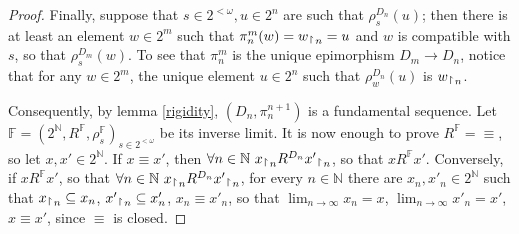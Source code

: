 \documentclass[12pt,twoside,a4paper]{amsart}
\theoremstyle{plain}
\theoremstyle{definition}
\begin{document}
\begin{proof}
Finally, suppose that $s\in 2^{<\omega },u\in 2^n$ are such that $\rho_s^{D_n}(u)$; then there is at least an element $w\in 2^m$ such that $\pi_n^m(w)=w {\, _{{\begin{tikzpicture}[{}]\draw (0,-0.5pt) -- (0,5pt);\draw (0,5pt) -- (1.5pt,3.5pt);\end{tikzpicture}}\, n}}=u$ and $w$ is compatible with $s$, so that $\rho_s^{D_m}(w)$.
To see that $\pi_n^m$ is the unique epimorphism $D_m\to D_n$, notice that for any $w\in 2^m$, the unique element $u\in 2^n$ such that $\rho_w^{D_n}(u)$ is $w {\, _{{\begin{tikzpicture}[{}]\draw (0,-0.5pt) -- (0,5pt);\draw (0,5pt) -- (1.5pt,3.5pt);\end{tikzpicture}}\, n}}$.

Consequently, by lemma \ref{rigidity}, $(D_n,\pi_n^{n+1})$ is a fundamental sequence.
Let $ \mathbb F =( {2^{\mathbb N}} ,R^{ \mathbb F },\rho_s^{ \mathbb F })_{s\in 2^{<\omega }}$ be its inverse limit.
It is now enough to prove $R^{ \mathbb F }= {\equiv } $, so let $x,x'\in {2^{\mathbb N}} $.
If $x\equiv x'$, then $\forall  n\in {\mathbb N} \ x {\, _{{\begin{tikzpicture}[{}]\draw (0,-0.5pt) -- (0,5pt);\draw (0,5pt) -- (1.5pt,3.5pt);\end{tikzpicture}}\, n}} R^{D_n}x' {\, _{{\begin{tikzpicture}[{}]\draw (0,-0.5pt) -- (0,5pt);\draw (0,5pt) -- (1.5pt,3.5pt);\end{tikzpicture}}\, n}} $, so that $xR^{ \mathbb F }x'$.
Conversely, if $xR^{ \mathbb F }x'$, so that $\forall n\in {\mathbb N} \ x {\, _{{\begin{tikzpicture}[{}]\draw (0,-0.5pt) -- (0,5pt);\draw (0,5pt) -- (1.5pt,3.5pt);\end{tikzpicture}}\, n}} R^{D_n}x' {\, _{{\begin{tikzpicture}[{}]\draw (0,-0.5pt) -- (0,5pt);\draw (0,5pt) -- (1.5pt,3.5pt);\end{tikzpicture}}\, n}} $, for every $n\in {\mathbb N} $ there are $x_n,x'_n\in {2^{\mathbb N}} $ such that $x {\, _{{\begin{tikzpicture}[{}]\draw (0,-0.5pt) -- (0,5pt);\draw (0,5pt) -- (1.5pt,3.5pt);\end{tikzpicture}}\, n}} \subseteq x_n$, $x' {\, _{{\begin{tikzpicture}[{}]\draw (0,-0.5pt) -- (0,5pt);\draw (0,5pt) -- (1.5pt,3.5pt);\end{tikzpicture}}\, n}}\subseteq x'_n$, $x_n\equiv x'_n$, so that $\lim_{n\rightarrow\infty }x_n=x$, $\lim_{n\rightarrow\infty }x'_n=x'$, $x\equiv x'$, since $\equiv $ is closed.
\end{proof}
\end{document}
